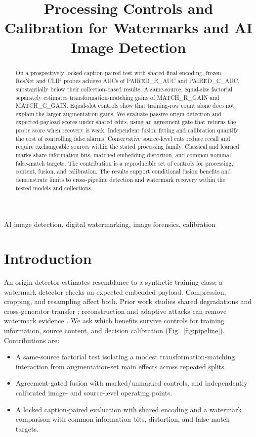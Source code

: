 \documentclass[conference]{IEEEtran}
\title{Processing Controls and Calibration for Watermarks and AI Image Detection}
\author{\IEEEauthorblockN{Anonymous Authors}}
\begin{document}
\maketitle
\begin{abstract}
On a prospectively locked caption-paired test with shared final encoding,
frozen ResNet and CLIP probes achieve AUCs of {{PAIRED_R_AUC}} and
{{PAIRED_C_AUC}}, substantially below their collection-based results.
A same-source, equal-size factorial separately estimates transformation-matching
gains of {{MATCH_R_GAIN}} and {{MATCH_C_GAIN}}.
Equal-slot controls show that training-row count alone does not explain
the larger augmentation gains. We evaluate passive origin detection and
expected-payload scores under shared edits, using an agreement gate that
returns the probe score when recovery is weak. Independent fusion fitting
and calibration quantify the cost of controlling false alarms. Conservative
source-level cuts reduce recall and require exchangeable sources within the
stated processing family. Classical and learned marks share information bits,
matched embedding distortion, and common nominal false-match targets.
The contribution is a reproducible set of controls for processing, content,
fusion, and calibration. The results support conditional fusion benefits
and demonstrate limits to cross-pipeline detection and watermark recovery
within the tested models and collections.
\end{abstract}
\begin{IEEEkeywords}
AI image detection, digital watermarking, image forensics, calibration
\end{IEEEkeywords}

\section{Introduction}
An origin detector estimates resemblance to a synthetic training class;
a watermark detector checks an expected embedded payload. Compression,
cropping, and resampling affect both. Prior work studies shared degradations
and cross-generator transfer \cite{univfd,genimage}; reconstruction and
adaptive attacks can remove watermark evidence \cite{zhao,unmarker}.
We ask which benefits survive controls for training information, source
content, and decision calibration (Fig.~\ref{fig:pipeline}). Contributions are:
\begin{itemize}
\item A same-source factorial test isolating a modest transformation-matching
interaction from augmentation-set main effects across repeated splits.
\item Agreement-gated fusion with marked/unmarked controls, and independently
calibrated image- and source-level operating points.
\item A locked caption-paired evaluation with shared encoding and a watermark
comparison with common information bits, distortion, and false-match targets.
\end{itemize}
\end{document}
